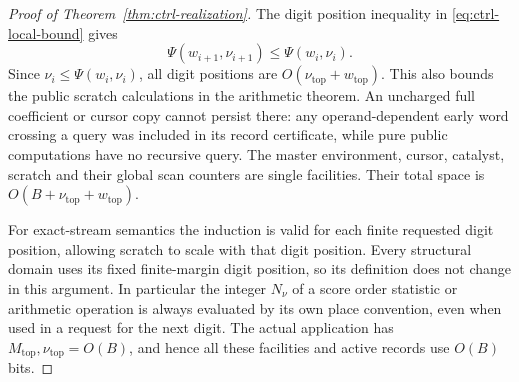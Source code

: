 \begin{proof}[Proof of Theorem~\ref{thm:ctrl-realization}]
The digit position inequality in \eqref{eq:ctrl-local-bound} gives
\begin{equation}\label{eq:ctrl-clock-invariant}
 \Psi(w_{i+1},\nu_{i+1})\le\Psi(w_i,\nu_i).
\end{equation}
Since $\nu_i\le\Psi(w_i,\nu_i)$, all digit positions are
$O(\nu_{\mathrm{top}}+w_{\mathrm{top}})$.
This also bounds the public scratch calculations in the arithmetic
theorem.  An uncharged full coefficient or cursor copy cannot persist
there: any operand-dependent early word crossing a query was included
in its record certificate, while pure public computations have no
recursive query.  The master environment, cursor, catalyst, scratch
and their global scan counters are single facilities.  Their total
space is $O(B+\nu_{\mathrm{top}}+w_{\mathrm{top}})$.

For exact-stream semantics the induction is valid for each finite
requested digit position, allowing scratch to scale with that digit position.  Every
structural domain uses its fixed finite-margin digit position, so its definition
does not change in this argument.  In particular the integer $N_\nu$ of a
score order statistic or arithmetic operation is always evaluated by its own
place convention, even when used in a request for the next digit.
The actual application has $M_{\mathrm{top}},\nu_{\mathrm{top}}=O(B)$,
and hence all these facilities and active records use $O(B)$ bits.
\end{proof}
